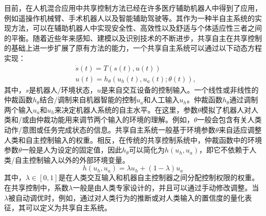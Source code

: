 目前，在人机混合应用中共享控制方法已经在许多医疗辅助机器人中得到了应用，例如遥操作机械臂、手术机器人以及智能辅助驾驶等。其作为一种半自主系统的实现方法，可以在辅助机器人中实现安全性、高效性以及舒适与个体适应性三者之间的平衡。随着近些年来感知、建模以及识别技术的不断进步，共享自主在共享控制的基础上进一步扩展了原有方法的能力，一个共享自主系统可以通过以下动态方程实现：
\begin{equation}
    \begin{aligned}
    & \dot{s}(t)=T(s(t), u(t)) \\
    & u(t)=h_\theta\left(u_h(t), u_a(t) ; \theta(t)\right),
    \end{aligned}
    \label{eq:2-1}
\end{equation}
其中，$s$是机器人/环境状态，$u$是来自交互设备的控制输入。一个线性或非线性的仲裁函数$h_θ$结合/调制来自机器智能的控制$u_a$和人工输入$u_h$。仲裁函数$h_θ$通过调制两个输入$u_a$和$u_h$来决定机器人系统的自主水平。在这里，参数$θ$模拟了机器人对人类和/或由仲裁功能用来调节两个输入的环境的理解。例如，$θ$一般会包含有关人类动作/意图或任务完成状态的信息。共享自主系统一般基于环境参数$θ$来自适应调整人类和自主控制输入的权重。相反，在传统的共享控制系统中，仲裁函数中的环境参数$θ$一般是人为设定的固定值，因此$h_θ$可以简化为$h(u_h,u_a)$，即它不依赖于人类/自主控制输入以外的外部环境变量。
\begin{equation}
    h\left(u_h, u_a\right)=\lambda u_h+(1-\lambda) u_a
    \label{eq:2-2}
\end{equation}
其中，$\lambda∈[0,1]$是在人类交互输入和机器自主控制器之间分配控制权限的权重。在共享控制中，系数$\lambda$一般是由人类专家设计的，并且可以通过手动修改调整。当$\lambda$被自动调优时，例如，通过对人类行为的推断或对人类输入的置信度的量化表征，其可以定义为共享自主系统。

